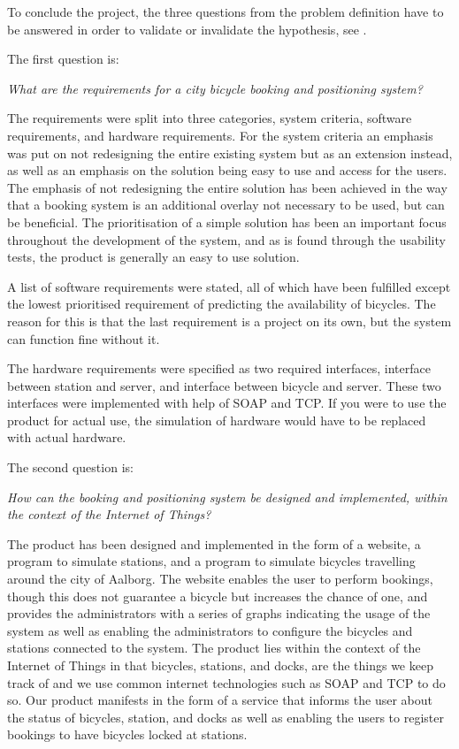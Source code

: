 To conclude the project, the three questions from the problem definition have to be answered in order to validate or invalidate the hypothesis, see .

The first question is:
\begin{center}
	\textit{What are the requirements for a city bicycle booking and positioning system?}
\end{center}

The requirements were split into three categories, system criteria, software requirements, and hardware requirements.
For the system criteria an emphasis was put on not redesigning the entire existing system but as an extension instead, as well as an emphasis on the solution being easy to use and access for the users.
The emphasis of not redesigning the entire solution has been achieved in the way that a booking system is an additional overlay not necessary to be used, but can be beneficial.
The prioritisation of a simple solution has been an important focus throughout the development of the system, and as is found through the usability tests, the product is generally an easy to use solution.

A list of software requirements were stated, all of which have been fulfilled except the lowest prioritised requirement of predicting the availability of bicycles. The reason for this is that the last requirement is a project on its own, but the system can function fine without it.

The hardware requirements were specified as two required interfaces, interface between station and server, and interface between bicycle and server.
These two interfaces were implemented with help of SOAP and TCP. 
If you were to use the product for actual use, the simulation of hardware would have to be replaced with actual hardware.

The second question is:
\begin{center}
	\textit{How can the booking and positioning system be designed and implemented, within the context of the Internet of Things?}
\end{center}

The product has been designed and implemented in the form of a website, a program to simulate stations, and a program to simulate bicycles travelling around the city of Aalborg.
The website enables the user to perform bookings, though this does not guarantee a bicycle but increases the chance of one, and provides the administrators with a series of graphs indicating the usage of the system as well as enabling the administrators to configure the bicycles and stations connected to the system.
The product lies within the context of the Internet of Things in that bicycles, stations, and docks, are the things we keep track of and we use common internet technologies such as SOAP and TCP to do so.
Our product manifests in the form of a service that informs the user about the status of bicycles, station, and docks as well as enabling the users to register bookings to have bicycles locked at stations.


